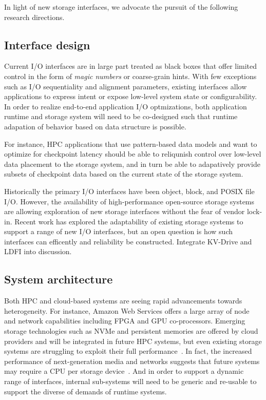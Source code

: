 \documentclass{sig-alternate}
\begin{document}
In light of new storage interfaces, we advocate the pursuit of the following
research directions.

\subsection{Interface design}

Current I/O interfaces are in large part treated as black boxes that offer
limited control in the form of \emph{magic numbers} or coarse-grain hints. With
few exceptions such as I/O sequentiality and alignment parameters, existing
interfaces allow applications to express intent or expose low-level system state
or configurability. In order to realize end-to-end application I/O optmizations,
both application runtime and storage system will need to be co-designed such that runtime
adapation of behavior based on data structure is possible.

For instance, HPC applications that use pattern-based data models and want to
optimize for checkpoint latency should be able to reliqunish control over low-level
data placement to the storage system, and in turn be able to adapatively provide
subsets of checkpoint data based on the current state of the storage system.

Historically the primary I/O interfaces have been object, block, and POSIX file
I/O. However, the availability of high-performance open-source storage systems
are allowing exploration of new storage interfaces without the fear of vendor
lock-in.  Recent work has explored the adaptability of existing storage systems
to support a range of new I/O interfaces, but an open question is how such
interfaces can efficently and reliability be constructed. Integrate KV-Drive and
LDFI into discussion.

\subsection{System architecture}

Both HPC and cloud-based systems are seeing rapid advancements towards
heterogeneity. For instance, Amazon Web Services offers a large array of node
and network capabilities including FPGA and GPU co-processors. Emerging storage
technologies such as NVMe and persistent memories are offered by cloud providers
and will be integrated in future HPC systems, but even existing storage systems
are struggling to exploit their full performance~\cite{xu:fast16-nova}. In fact, the increased
performance of next-generation media and networks suggests that future systems
may require a CPU per storage device~\cite{samuels:oss16}. And in order to support a
dynamic range of interfaces, internal sub-systems will need to be generic and
re-usable to support the diverse of demands of runtime systems.
\end{document}
